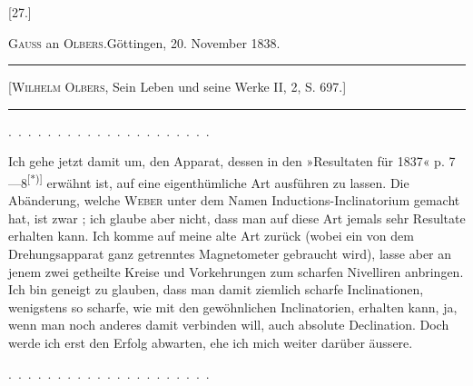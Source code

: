 \bigskip{}
\begin{center}[27.]\end{center}
\begin{center}\textsc{Gauss} an \textsc{Olbers}.\quad Göttingen, 20. November 1838.\end{center}
\begin{center}\begin{minipage}{.88\linewidth}\centering\hrule\vspace{3pt}
\small [\textsc{Wilhelm Olbers}, Sein Leben und seine Werke II, 2, S. 697.]
\par\vspace{3pt}\hrule\end{minipage}\end{center}
\noindent .\ .\ .\ .\ .\ .\ .\ .\ .\ .\ .\ .\ .\ .\ .\ .\ .\ .\ .\ .\ .\par
\indent Ich gehe jetzt damit um, den Apparat, dessen in den »Resultaten für
1837« p. 7—8\textsuperscript{[*)]} erwähnt ist, auf eine eigenthümliche Art ausführen zu lassen.
Die Abänderung, welche \textsc{Weber} unter dem Namen Inductions-Inclinatorium
gemacht hat, ist zwar ; ich glaube aber
nicht, dass man auf diese Art jemals sehr  Resultate erhalten kann.
Ich komme auf meine alte Art zurück (wobei ein von dem Drehungsapparat
ganz getrenntes Magnetometer gebraucht wird), lasse aber an jenem zwei getheilte
Kreise und Vorkehrungen zum scharfen Nivelliren anbringen. Ich
bin geneigt zu glauben, dass man damit ziemlich scharfe Inclinationen, wenigstens
so scharfe, wie mit den gewöhnlichen Inclinatorien, erhalten kann, ja,
wenn man noch anderes damit verbinden will, auch absolute Declination.
Doch werde ich erst den Erfolg abwarten, ehe ich mich weiter darüber äussere.
\par\noindent .\ .\ .\ .\ .\ .\ .\ .\ .\ .\ .\ .\ .\ .\ .\ .\ .\ .\ .\ .\ .
\begingroup\renewcommand{\thefootnote}{}\endgroup
\clearpage\endgroup
